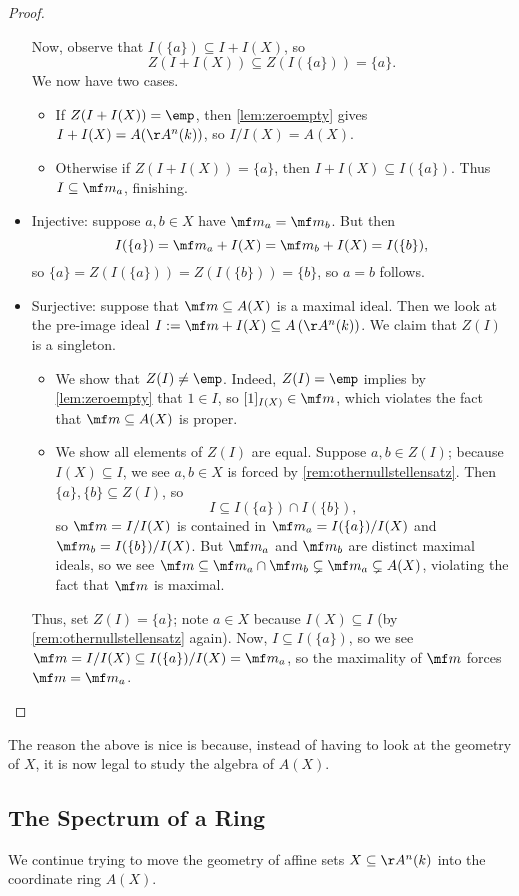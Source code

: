 \begin{proof}
\begin{itemize}
		Now, observe that $I(\{a\})\subseteq I+I(X)$, so
		\[Z(I+I(X))\subseteq Z(I(\{a\}))=\{a\}.\]
		We now have two cases.
		\begin{itemize}
			\item If $Z(I+I(X))=\emp$, then \autoref{lem:zeroempty} gives $I+I(X)=A(\AA^n(k))$, so $I/I(X)=A(X)$.
			\item Otherwise if $Z(I+I(X))=\{a\}$, then $I+I(X)\subseteq I(\{a\})$. Thus $I\subseteq\mf m_a$, finishing.
		\end{itemize}
		\item Injective: suppose $a,b\in X$ have $\mf m_a=\mf m_b$. But then
		\[I(\{a\})=\mf m_a+I(X)=\mf m_b+I(X)=I(\{b\}),\]
		so $\{a\}=Z(I(\{a\}))=Z(I(\{b\}))=\{b\}$, so $a=b$ follows.
		\item Surjective: suppose that $\mf m\subseteq A(X)$ is a maximal ideal. Then we look at the pre-image ideal $I:=\mf m+I(X)\subseteq A\left(\AA^n(k)\right)$. We claim that $Z(I)$ is a singleton.
		\begin{itemize}
			\item We show that $Z(I)\ne\emp$. Indeed, $Z(I)=\emp$ implies by \autoref{lem:zeroempty} that $1\in I$, so $[1]_{I(X)}\in\mf m$, which violates the fact that $\mf m\subseteq A(X)$ is proper.
			\item We show all elements of $Z(I)$ are equal. Suppose $a,b\in Z(I)$; because $I(X)\subseteq I$, we see $a,b\in X$ is forced by \autoref{rem:othernullstellensatz}. Then $\{a\},\{b\}\subseteq Z(I)$, so
			\[I\subseteq I(\{a\})\cap I(\{b\}),\]
			so $\mf m=I/I(X)$ is contained in $\mf m_a=I(\{a\})/I(X)$ and $\mf m_b=I(\{b\})/I(X)$. But $\mf m_a$ and $\mf m_b$ are distinct maximal ideals, so we see $\mf m\subseteq\mf m_a\cap\mf m_b\subsetneq\mf m_a\subsetneq A(X)$, violating the fact that $\mf m$ is maximal.
		\end{itemize}
		Thus, set $Z(I)=\{a\}$; note $a\in X$ because $I(X)\subseteq I$ (by \autoref{rem:othernullstellensatz} again). Now, $I\subseteq I(\{a\})$, so we see $\mf m=I/I(X)\subseteq I(\{a\})/I(X)=\mf m_a$, so the maximality of $\mf m$ forces $\mf m=\mf m_a$.
		\qedhere
	\end{itemize}
\end{proof}
The reason the above is nice is because, instead of having to look at the geometry of $X$, it is now legal to study the algebra of $A(X)$.

\subsection{The Spectrum of a Ring}
We continue trying to move the geometry of affine sets $X\subseteq\AA^n(k)$ into the coordinate ring $A(X)$.

